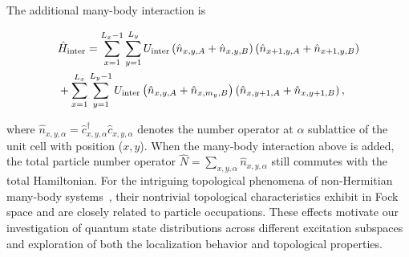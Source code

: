 \documentclass[longbibliography, aps, prx, amsmath, amssymb, amsfonts, twocolumn,superscriptaddress, footinbib]{revtex4-1}
\begin{document}
    The additional many-body interaction is
        \begin{small}
		\begin{align}
			&\hat{H}_{\text{inter}}  = \sum_{{x}=1}^{L_{x}-1} \sum_{{y}=1}^{L_{y}}  U_{\text{inter}} \left(\hat{n}_{{x}, {y}, A}+\hat{n}_{{x}, {y}, B}\right) \left(\hat{n}_{{x}+1, {y}, A}+\hat{n}_{{x}+1, {y}, B}\right)\notag\\
			& + 
			\sum_{{x}=1}^{L_{x}} \sum_{{y}=1}^{L_{y}-1}  U_{\text{inter}} \left(\hat{n}_{{x}, {y}, A}+\hat{n}_{{x}, m_y, B}\right) \left(\hat{n}_{{x}, {y}+1, A}+\hat{n}_{{x}, {y}+1, B}\right), \label{eq:inter_cell}
		\end{align}
        \end{small}
	where $\hat{n}_{{x},{y},\alpha}=\hat{c}_{x,y,\alpha}^{\dagger}\hat{c}_{x,y,\alpha}$ denotes the number operator at $\alpha$ sublattice of the unit cell with position (${x},{y}$). When the many-body interaction above is added, the
	total particle number operator $\hat{N} = \sum_{x,y,\alpha} \hat{n}_{x,y,\alpha}$ still commutes with the total Hamiltonian.
    For the intriguing topological phenomena of non-Hermitian many-body systems~\cite{shen2024enhanced,shimomura2024general,deng2022observing}, their nontrivial topological characteristics exhibit in Fock space and are closely related to particle occupations. These effects motivate our investigation of quantum state distributions across different excitation subspaces and exploration of both the localization behavior and topological properties.
\end{document}
